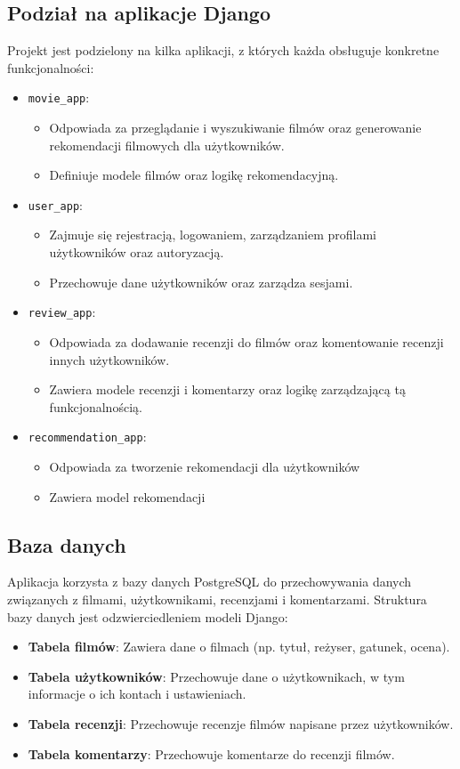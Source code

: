 \documentclass[../main.tex]{subfiles}
\begin{document}
\subsection{Podział na aplikacje Django}
Projekt jest podzielony na kilka aplikacji, z których każda obsługuje konkretne funkcjonalności:
\begin{itemize}
	\item \texttt{movie\_app}:
	      \begin{itemize}
		      \item Odpowiada za przeglądanie i wyszukiwanie filmów oraz generowanie rekomendacji filmowych dla użytkowników.
		      \item Definiuje modele filmów oraz logikę rekomendacyjną.
	      \end{itemize}
	\item \texttt{user\_app}:
	      \begin{itemize}
		      \item Zajmuje się rejestracją, logowaniem, zarządzaniem profilami użytkowników oraz autoryzacją.
		      \item Przechowuje dane użytkowników oraz zarządza sesjami.
	      \end{itemize}
	\item \texttt{review\_app}:
	      \begin{itemize}
		      \item Odpowiada za dodawanie recenzji do filmów oraz komentowanie recenzji innych użytkowników.
		      \item Zawiera modele recenzji i komentarzy oraz logikę zarządzającą tą funkcjonalnością.
	      \end{itemize}
	\item \texttt{recommendation\_app}:
	      \begin{itemize}
		      \item Odpowiada za tworzenie rekomendacji dla użytkowników
		      \item Zawiera model rekomendacji
	      \end{itemize}
\end{itemize}

\subsection{Baza danych}
Aplikacja korzysta z bazy danych PostgreSQL do przechowywania danych związanych z filmami, użytkownikami, recenzjami i komentarzami. Struktura bazy danych jest odzwierciedleniem modeli Django:
\begin{itemize}
	\item \textbf{Tabela filmów}: Zawiera dane o filmach (np. tytuł, reżyser, gatunek, ocena).
    \item \textbf{Tabela użytkowników}: Przechowuje dane o użytkownikach, w tym informacje o ich kontach i ustawieniach.
    \item \textbf{Tabela recenzji}: Przechowuje recenzje filmów napisane przez użytkowników.
    \item \textbf{Tabela komentarzy}: Przechowuje komentarze do recenzji filmów.
\end{itemize}
\end{document}
